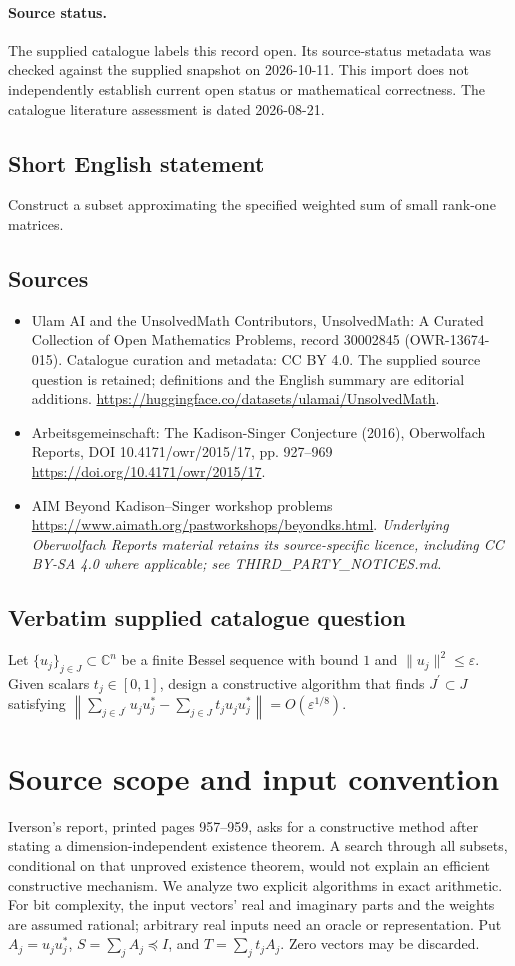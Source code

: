 \documentclass[11pt]{article}
\begin{document}
\paragraph{Source status.}
The supplied catalogue labels this record open. Its source-status metadata was checked against the supplied snapshot on 2026-10-11. This import does not independently establish current open status or mathematical correctness. The catalogue literature assessment is dated 2026-08-21.
\subsection{Short English statement}
Construct a subset approximating the specified weighted sum of small rank-one matrices.
\subsection{Sources}
\begin{itemize}
\item[S1] Ulam AI and the UnsolvedMath Contributors, UnsolvedMath: A Curated Collection of Open Mathematics Problems, record 30002845 (OWR-13674-015). Catalogue curation and metadata: CC BY 4.0. The supplied source question is retained; definitions and the English summary are editorial additions.
\url{https://huggingface.co/datasets/ulamai/UnsolvedMath}.
\item[S2] Arbeitsgemeinschaft: The Kadison-Singer Conjecture (2016), Oberwolfach Reports, DOI 10.4171/owr/2015/17, pp. 927--969
\url{https://doi.org/10.4171/owr/2015/17}.
\item[S3] AIM Beyond Kadison--Singer workshop problems
\url{https://www.aimath.org/pastworkshops/beyondks.html}.
\textit{Underlying Oberwolfach Reports material retains its source-specific licence, including CC BY-SA 4.0 where applicable; see THIRD\_PARTY\_NOTICES.md.}
\end{itemize}
\subsection{Verbatim supplied catalogue question}
Let $\{u_j\}_{j\in J}\subset\mathbb{C}^n$ be a finite Bessel sequence with bound $1$ and $\lVert u_j\rVert^2\leq\varepsilon$. Given scalars $t_j\in[0,1]$, design a constructive algorithm that finds $J^\prime\subset J$ satisfying $\left\lVert\sum_{j\in J^\prime}u_ju_j^*-\sum_{j\in J}t_ju_ju_j^*\right\rVert=O(\varepsilon^{1/8})$.

\section{Source scope and input convention}
Iverson's report, printed pages 957--959, asks for a constructive method after
stating a dimension-independent existence theorem. A search through all subsets,
conditional on that unproved existence theorem, would not explain an efficient
constructive mechanism. We analyze two explicit algorithms in exact arithmetic.
For bit complexity, the input vectors' real and imaginary parts and the weights
are assumed rational; arbitrary real inputs need an oracle or representation.
Put $A_j=u_ju_j^*$, $S=\sum_jA_j\preceq I$, and
$T=\sum_jt_jA_j$. Zero vectors may be discarded.
\end{document}
